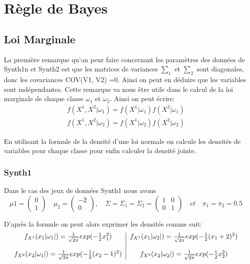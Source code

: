 \documentclass[10pt]{article}
\begin{document}
				
				
	
	\section{Règle de Bayes}
	\subsection{Loi Marginale}
	La première remarque qu'on peur faire concernant les paramètres des données de Synth1n et Synth2 est que les matrices de variances $\sum_{1}$ et $\sum_{2} $ sont diagonales, donc les covariances COV(V1, V2) =0. Ainsi on peut en déduire que les variables sont indépendantes. Cette remarque va nous être utile dans le calcul de la loi marginale de chaque classe $\omega_{1} $ et $ \omega_{2}$. Ainsi on peut écrire:
	\begin{equation}
	\begin{split}
		f(X^{1}, X^{2}| \omega_{1}) = f(X^{1}|\omega_{1})  f(X^{2}|\omega_{1})\\
		f(X^{1}, X^{2}| \omega_{2}) = f(X^{1}|\omega_{2})  f(X^{2}|\omega_{2})
		\end{split}
		\label{1}
	\end{equation}
	
En utilisant la formule de la densité d'une loi normale on calcule les densités  de variables pour chaque classe pour enfin calculer la densité jointe.

\subsubsection{Synth1}
Dans le cas des jeux de données Synth1 nous avons \[\mu{1}= \begin{pmatrix} 0 \\ 1 \end{pmatrix} \quad \mu_{2}= \begin{pmatrix} -2 \\ 0 \end{pmatrix}, \quad  \Sigma = \Sigma_{1} = \Sigma_{2} = \begin{pmatrix} 1 & 0 \\ 0 & 1	\end{pmatrix} \quad et  \quad \pi_{1} = \pi_{2} = 0.5\]


D'après la formule   on peut alors exprimer les densités comme suit:\\
\begin{equation}
\begin{tabular}{c | c}
	$f_{X^{1}}(x_{1}|\omega_{1}|) = \frac{1}{\sqrt{2\pi}}exp(-\frac{1}{2} x_{1}^{2})$ & 	$f_{X^{1}}(x_{1}|\omega_{2}|) = \frac{1}{\sqrt{2\pi}}exp(-\frac{1}{2} (x_{1}+2)^{2})$\\\\
	$f_{X^{2}}(x_{2}|\omega_{1}|) = \frac{1}{\sqrt{2\pi}}exp(-\frac{1}{2} (x_{2}-1)^{2})$ & 	$f_{X^{2}}(x_{2}|\omega_{2}|) = \frac{1}{\sqrt{2\pi}}exp(-\frac{1}{2} x_{2}^{2})$\\
\end{tabular}
\label{3}
\end{equation}
\end{document}
